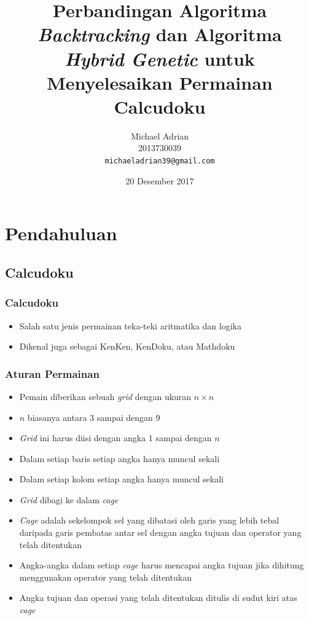\documentclass{beamer}
\title{Perbandingan Algoritma \textit{Backtracking} dan Algoritma \textit{Hybrid Genetic} untuk Menyelesaikan Permainan Calcudoku}
\author{Michael Adrian \\ 2013730039 \\ \texttt{michaeladrian39@gmail.com}}
\institute{Program Studi Teknik Informatika \\ Fakultas Teknologi Informasi dan Sains \\ Universitas Katolik Parahyangan}
\date{20 Desember 2017}
\begin{document}
\begin{frame}
\titlepage
\end{frame}

\section{Pendahuluan}

\subsection{Calcudoku}

\begin{frame}
\frametitle{Calcudoku}
\begin{itemize}
\item Salah satu jenis permainan teka-teki aritmatika dan logika
\item Dikenal juga sebagai KenKen, KenDoku, atau Mathdoku
\end{itemize}
\end{frame}


\begin{frame}
\frametitle{Aturan Permainan}
\begin{itemize}
\item Pemain diberikan sebuah \textit{grid} dengan ukuran \begin{math}n \times n\end{math}
\item \begin{math}n\end{math} biasanya antara 3 sampai dengan 9
\item \textit{Grid} ini harus diisi dengan angka 1 sampai dengan \begin{math}n\end{math}
\item Dalam setiap baris setiap angka hanya muncul sekali
\item Dalam setiap kolom setiap angka hanya muncul sekali
\item \textit{Grid} dibagi ke dalam \textit{cage}
\item \textit{Cage} adalah sekelompok sel yang dibatasi oleh garis yang lebih tebal daripada garis pembatas antar sel dengan angka tujuan dan operator yang telah ditentukan
\item Angka-angka dalam setiap \textit{cage} harus mencapai angka tujuan jika dihitung menggunakan operator yang telah ditentukan
\item Angka tujuan dan operasi yang telah ditentukan ditulis di sudut kiri atas \textit{cage}
\end{itemize}
\end{frame}
\end{document}
